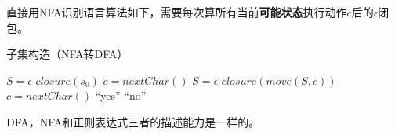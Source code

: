 直接用NFA识别语言算法如下，需要每次算所有当前\textbf{可能状态}执行动作$c$后的$\epsilon$闭包。
\begin{algorithm}[H]
\centering
\caption{子集构造（NFA转DFA）}
\begin{algorithmic}[1]
\State $S=\epsilon$-$closure(s_0)$
\State $c=nextChar()$
\State $S=\epsilon$-$closure(move(S,c))$
\State $c=nextChar()$
\EndWhile
{}
\State\Return ``yes''
\Else
\State\Return ``no''
\EndIf
\end{algorithmic}
\end{algorithm}

\begin{theorem}
DFA，NFA和正则表达式三者的描述能力是一样的。
\end{theorem}